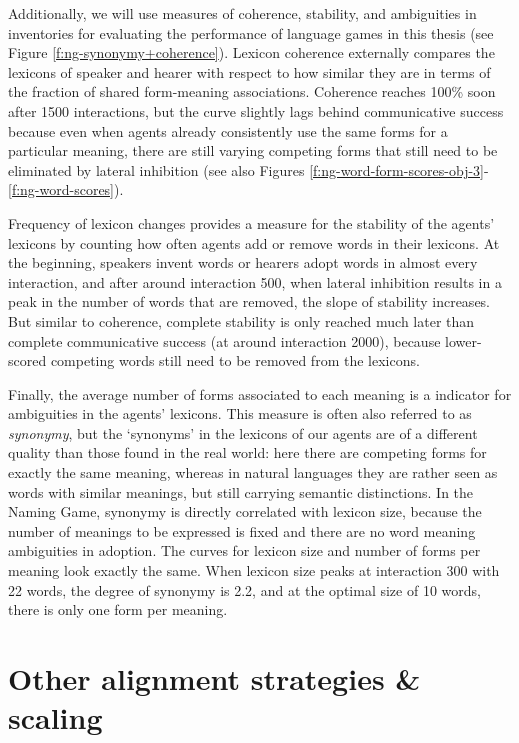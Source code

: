 Additionally, we will use measures of coherence, stability, and
ambiguities in inventories for evaluating the performance of language
games in this thesis (see Figure
\ref{f:ng-synonymy+coherence}). Lexicon coherence externally compares
the lexicons of speaker and hearer with respect to how similar they
are in terms of the fraction of shared form-meaning
associations. Coherence reaches 100\% soon after 1500 interactions,
but the curve slightly lags behind communicative success because even
when agents already consistently use the same forms for a particular
meaning, there are still varying competing forms that still need to be
eliminated by lateral inhibition (see also Figures
\ref{f:ng-word-form-scores-obj-3}-\ref{f:ng-word-scores}). 

Frequency of lexicon changes provides a measure for the stability of
the agents' lexicons by counting how often agents add or remove words
in their lexicons. At the beginning, speakers invent words or hearers
adopt words in almost every interaction, and after around interaction
500, when lateral inhibition results in a peak in the number of words
that are removed, the slope of stability increases. But similar to
coherence, complete stability is only reached much later than complete
communicative success (at around interaction 2000), because
lower-scored competing words still need to be removed from the
lexicons.

Finally, the average number of forms associated to each meaning is a
indicator for ambiguities in the agents' lexicons. This measure is
often also referred to as \emph{synonymy}, but the `synonyms' in the
lexicons of our agents are of a different quality than those found in
the real world: here there are competing forms for exactly the same
meaning, whereas in natural languages they are rather seen as words
with similar meanings, but still carrying semantic distinctions. In
the Naming Game, synonymy is directly correlated with lexicon size,
because the number of meanings to be expressed is fixed and there are
no word meaning ambiguities in adoption. The curves for lexicon size
and number of forms per meaning look exactly the same. When lexicon
size peaks at interaction 300 with 22 words, the degree of synonymy is
2.2, and at the optimal size of 10 words, there is only one form per
meaning.


\section{Other alignment strategies \& scaling}
\label{s:ng-alignment-strategies}


